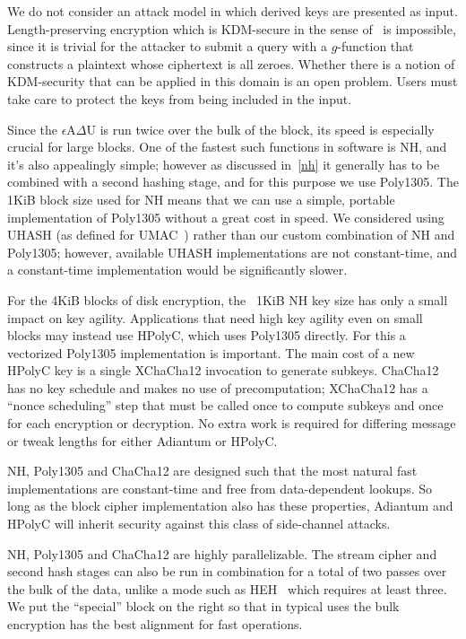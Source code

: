\documentclass[journal=tosc,preprint,floatrow,submission]{iacrtrans}
\begin{document}
We do not consider an attack model in which derived keys are presented as input.
Length-preserving encryption
which is KDM-secure in the sense of~\cite{kdm} is impossible, since it is trivial for the
attacker to submit a query with a $g$-function
that constructs a plaintext whose ciphertext is all zeroes.
Whether there is a notion of KDM-security that can be
applied in this domain is an open problem. Users must take care to protect the keys from being
included in the input.

Since the $\epsilon$A$\Delta$U is run twice over the bulk of the block, its speed is especially
crucial for large blocks. One of the fastest such functions in software is NH, and
it's also appealingly simple; however as discussed in~\autoref{nh} it generally has to be
combined with a second hashing stage, and for this purpose we use Poly1305. The 1KiB block size
used for NH means that we can use a simple, portable implementation of Poly1305 without a great
cost in speed.  We considered using UHASH (as defined for UMAC~\cite{rfc4418}) rather than our
custom combination of NH and Poly1305; however, available UHASH implementations
are not constant-time, and a constant-time implementation would be significantly
slower.

For the 4KiB blocks of disk encryption,
the ~1KiB NH key size has only a small impact on key agility. Applications
that need high key agility even on small blocks may instead use HPolyC, which
uses Poly1305 directly. For this a vectorized Poly1305 implementation is important.  The main
cost of a new HPolyC key is a single XChaCha12 invocation to generate subkeys.
ChaCha12 has no key schedule
and makes no use of precomputation; XChaCha12 has a ``nonce scheduling'' step
that must be called once to compute subkeys and once for each encryption or
decryption.  No extra work is required for differing message or tweak lengths for either Adiantum
or HPolyC.

NH, Poly1305 and ChaCha12 are designed such that the most natural fast implementations are
constant-time and free from data-dependent lookups. So long as the block cipher implementation
also has these properties, Adiantum and HPolyC will inherit security against
this class of side-channel attacks.

NH, Poly1305 and ChaCha12 are highly parallelizable.
The stream cipher and second hash stages can also be run in combination for a total
of two passes over the bulk of the data, unlike a mode such as HEH~\cite{heh}
which requires at least three.
We put the ``special'' block on the right so that in typical uses the bulk encryption has
the best alignment for fast operations.
\end{document}
